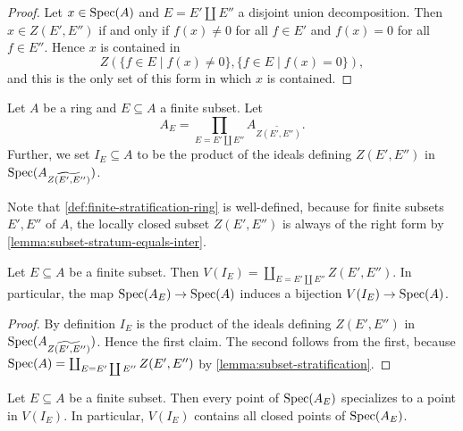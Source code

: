 \begin{proof}
    Let $x \in \mathrm{Spec}(A)$ and $E = E' \coprod E''$ a disjoint union decomposition. Then
    $x \in Z(E', E'')$ if and only if $f(x) \neq 0$ for all $f \in E'$ and $f(x) = 0$
    for all $f \in E''$. Hence $x$ is contained in
    \[
    Z(\{ f \in E  \mid f(x) \neq 0\}, \{f \in E  \mid f(x) = 0\})
    ,\] and this is the only set of this form in which $x$ is contained.
\end{proof}

\begin{definition}
    Let $A$ be a ring and $E \subseteq A$ a finite subset. Let
    \[
    A_{E} = \prod_{E = E' \coprod E''} A_{\widetilde{Z(E', E'')}}
    .\]
    Further, we set $I_E \subseteq A$ to be the product of the ideals
    defining $Z(E', E'')$ in $\mathrm{Spec}(A_{\widetilde{Z(E', E'')}})$.
    \label{def:finite-stratification-ring}
    \leanok
\end{definition}

Note that \ref{def:finite-stratification-ring} is well-defined, because for finite
subsets $E', E''$ of $A$, the locally closed subset $Z(E', E'')$ is always
of the right form by \ref{lemma:subset-stratum-equals-inter}.

\begin{lemma}
    Let $E \subseteq A$ be a finite subset. Then
    $V(I_E) = \coprod_{E = E' \coprod E''} Z(E', E'')$. In particular,
    the map $\mathrm{Spec}(A_E) \to \mathrm{Spec}(A)$ induces a bijection $V(I_E) \to \mathrm{Spec}(A)$.
    \label{lemma:finite-stratification-ideal-bijection}
\end{lemma}

\begin{proof}
    By definition $I_E$ is the product of the ideals defining $Z(E', E'')$ in
    $\mathrm{Spec}(A_{\widetilde{Z(E', E'')}})$. Hence the first claim. The second
    follows from the first, because $\mathrm{Spec}(A) = \coprod_{E = E' \coprod E''} Z(E', E'')$ by
    \ref{lemma:subset-stratification}.
\end{proof}

\begin{lemma}
    Let $E \subseteq A$ be a finite subset. Then every point of $\mathrm{Spec}(A_E)$ specializes
    to a point in $V(I_E)$. In particular, $V(I_E)$ contains all closed points of $\mathrm{Spec}(A_E)$.%
    \label{lemma:finite-stratification-closed-points}
    \leanok
\end{lemma}

